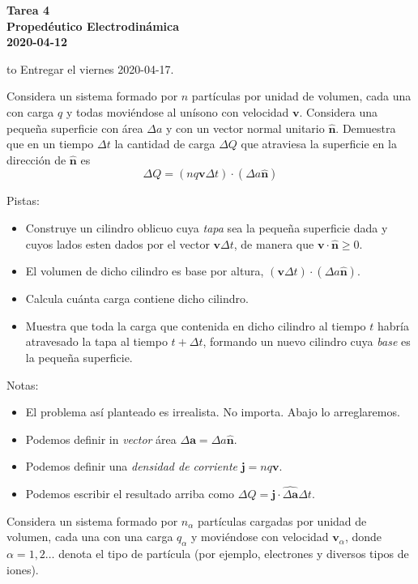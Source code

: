 \documentclass{exam}
\begin{document}
\begin{center}
\bf\large Tarea 4\\
Propedéutico Electrodinámica\\
2020-04-12\\[20pt]
\end{center}
\hbox to \textwidth{Nombre: \enspace\hrulefill}
Entregar el viernes 2020-04-17.

\begin{questions}
\question Considera un sistema formado por $n$ partículas por unidad
  de volumen, cada una con carga $q$ y todas moviéndose al unísono con
  velocidad $\bm v$. Considera una pequeña superficie con área $\Delta
  a$ y con un vector normal unitario $\hat {\bm n}$. Demuestra que en
  un tiempo $\Delta t$ la cantidad de carga $\Delta Q$ que atraviesa
  la superficie en la dirección de $\hat{\bm n}$  es
  $$
  \Delta Q=(n q \bm v\Delta t)\cdot(\Delta a \hat{\bm n})
  $$

  Pistas:
  \begin{itemize}
  \item Construye un cilindro oblicuo cuya {\em tapa} sea la pequeña
    superficie dada y cuyos lados esten dados por el vector $\bm v\Delta
    t$, de manera que $\bm v\cdot\hat{\bm n} \ge 0$.
  \item El volumen de dicho cilindro es base por altura, $(\bm v\Delta
    t)\cdot(\Delta a\hat{\bm n})$.
  \item Calcula cuánta carga contiene dicho cilindro.
  \item  Muestra que toda la carga que contenida en dicho cilindro al
    tiempo $t$ habría atravesado la tapa al tiempo $t+\Delta t$,
    formando un nuevo cilindro cuya {\em base} es la pequeña
    superficie.
  \end{itemize}

  Notas:
  \begin{itemize}
  \item El problema así planteado es irrealista. No importa. Abajo lo arreglaremos.
  \item Podemos definir in {\em vector} área $\Delta \bm a=\Delta
    a\hat{\bm n}$.
  \item Podemos definir una {\em densidad de corriente} $\bm j=n q\bm
    v$.
  \item Podemos escribir el resultado arriba como $\Delta Q=\bm
    j\cdot\hat{\Delta \bm a}\Delta t$.
  \end{itemize}

  \question Considera un sistema formado por $n_\alpha$ partículas cargadas por
    unidad de volumen, cada una con una carga $q_\alpha$ y moviéndose
    con velocidad $\bm v_\alpha$, donde
    $\alpha=1,2\ldots$ denota el tipo de partícula (por ejemplo,
    electrones y diversos tipos de iones).
    \begin{parts}

\end{parts}
\end{questions}
\end{document}
